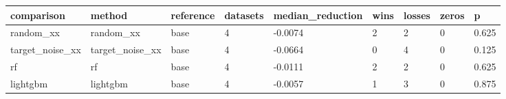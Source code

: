 \begin{tabular}{lllllllll}
\toprule
comparison & method & reference & datasets & median\_reduction & wins & losses & zeros & p \\
\midrule
random\_xx & random\_xx & base & 4 & -0.0074 & 2 & 2 & 0 & 0.625 \\
target\_noise\_xx & target\_noise\_xx & base & 4 & -0.0664 & 0 & 4 & 0 & 0.125 \\
rf & rf & base & 4 & -0.0111 & 2 & 2 & 0 & 0.625 \\
lightgbm & lightgbm & base & 4 & -0.0057 & 1 & 3 & 0 & 0.875 \\
\bottomrule
\end{tabular}
